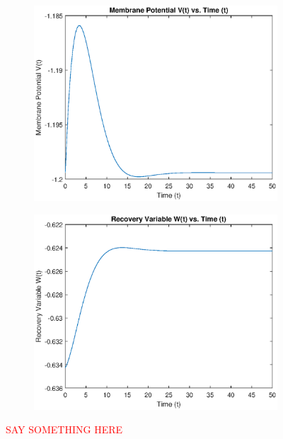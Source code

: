\documentclass{book}
\theoremstyle{definition}
\begin{document}
\begin{figure}[!htb]
	\centering
	\begin{subfigure}{0.5\textwidth}
		\centering
		\includegraphics[scale=0.6]{FHN_lab/V_t_1.eps}
	\end{subfigure}%
	\begin{subfigure}{0.5\textwidth}
		\centering
		\includegraphics[scale=0.6]{FHN_lab/W_t_1.eps}
	\end{subfigure}%
	\caption{\textcolor{red}{SAY SOMETHING HERE}}
	\label{Fig:1}
\end{figure}
\end{document}
